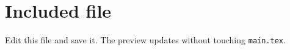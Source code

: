 \section{Included file}
Edit this file and save it. The preview updates without touching \texttt{main.tex}.

